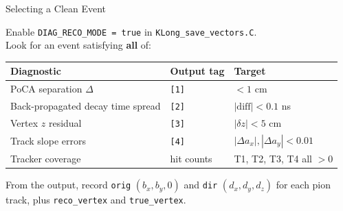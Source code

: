 \documentclass[aspectratio=169,10pt]{beamer}
\begin{document}
\begin{frame}{Selecting a Clean Event}

Enable \texttt{DIAG\_RECO\_MODE = true} in \texttt{KLong\_save\_vectors.C}.\\
Look for an event satisfying \textbf{all} of:

\medskip
\begin{center}
\begin{tabular}{lll}
    \toprule
    \textbf{Diagnostic} & \textbf{Output tag} & \textbf{Target} \\
    \midrule
    PoCA separation $\Delta$          & \texttt{[1]} & $< 1$ cm \\
    Back-propagated decay time spread & \texttt{[2]} & $|\text{diff}| < 0.1$ ns \\
    Vertex $z$ residual               & \texttt{[3]} & $|\delta z| < 5$ cm \\
    Track slope errors                & \texttt{[4]} & $|\Delta a_x|,|\Delta a_y| < 0.01$ \\
    Tracker coverage                  & hit counts   & T1, T2, T3, T4 all $> 0$ \\
    \bottomrule
\end{tabular}
\end{center}

\medskip
From the output, record \texttt{orig} $(b_x, b_y, 0)$ and \texttt{dir} $(d_x, d_y, d_z)$ for each pion track, plus \texttt{reco\_vertex} and \texttt{true\_vertex}.

\end{frame}
\end{document}
